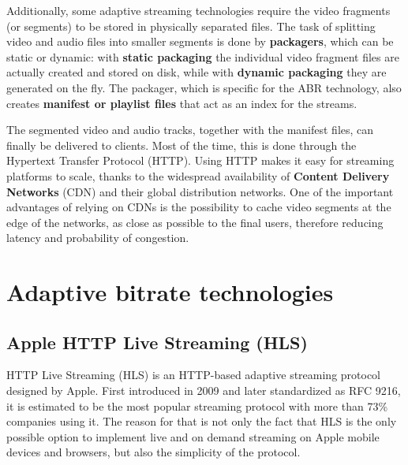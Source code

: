 Additionally, some adaptive streaming technologies require the video fragments (or segments) to be stored in physically separated files. The task of splitting video and audio files into smaller segments is done by \textbf{packagers}, which can be static or dynamic: with \textbf{static packaging} the individual video fragment files are actually created and stored on disk, while with \textbf{dynamic packaging} they are generated on the fly. The packager, which is specific for the ABR technology, also creates \textbf{manifest or playlist files} that act as an index for the streams.

The segmented video and audio tracks, together with the manifest files, can finally be delivered to clients. Most of the time, this is done through the Hypertext Transfer Protocol (HTTP). Using HTTP makes it easy for streaming platforms to scale, thanks to the widespread availability of \textbf{Content Delivery Networks} (CDN) and their global distribution networks. One of the important advantages of relying on CDNs is the possibility to cache video segments at the edge of the networks, as close as possible to the final users, therefore reducing latency and probability of congestion.





\section{Adaptive bitrate technologies}
\label{sec:bg/abr}

\subsection{Apple HTTP Live Streaming (HLS)}
\label{sec:bg/abr/hls}

HTTP Live Streaming (HLS) is an HTTP-based adaptive streaming protocol designed by Apple. First introduced in 2009 and later standardized as RFC 9216, it is estimated to be the most popular streaming protocol with more than 73\% companies using it.\cite{rfc8216}\cite{bitmovin} The reason for that is not only the fact that HLS is the only possible option to implement live and on demand streaming on Apple mobile devices and browsers, but also the simplicity of the protocol.

